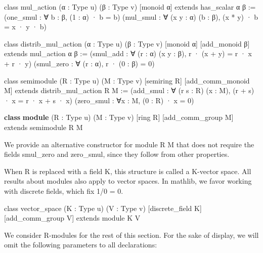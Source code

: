 \documentclass[
]{article}
\newenvironment{Shaded}{}{}
\newcommand{\DataTypeTok}[1]{\textcolor[rgb]{0.56,0.13,0.00}{#1}}
\newcommand{\KeywordTok}[1]{\textcolor[rgb]{0.00,0.44,0.13}{\textbf{#1}}}
\newcommand{\NormalTok}[1]{#1}
\begin{document}
\begin{Shaded}
\begin{Highlighting}[]
\NormalTok{class mul\_action (α : Type u) (β : Type v)}
\NormalTok{    [monoid α] extends has\_scalar α β :=}
\NormalTok{(one\_smul : ∀ b : β, (1 : α) · b = b)}
\NormalTok{(mul\_smul : ∀ (x y : α) (b : β),}
\NormalTok{    (x * y) · b = x · y · b)}

\NormalTok{class distrib\_mul\_action (α : Type u)}
\NormalTok{    (β : Type v) [monoid α] [add\_monoid β]}
\NormalTok{    extends mul\_action α β :=}
\NormalTok{(smul\_add : ∀ (r : α) (x y : β),}
\NormalTok{    r · (x + y) = r · x + r · y)}
\NormalTok{(smul\_zero : ∀ (r : α), r · (0 : β) = 0)}

\NormalTok{class semimodule (R : Type u) (M : Type v)}
\NormalTok{    [semiring R] [add\_comm\_monoid M]}
\NormalTok{    extends distrib\_mul\_action R M :=}
\NormalTok{(add\_smul : ∀ (r s : R) (x : M),}
\NormalTok{    (r + s) · x = r · x + s · x)}
\NormalTok{(zero\_smul : ∀x : M, (0 : R) · x = 0) }
\end{Highlighting}
\end{Shaded}

\begin{Shaded}
\begin{Highlighting}[]
\KeywordTok{class} \KeywordTok{module}\NormalTok{ (R : }\DataTypeTok{Type}\NormalTok{ u) (M : }\DataTypeTok{Type}\NormalTok{ v)}
\NormalTok{    [ring R] [add\_comm\_group M]}
\NormalTok{    extends semimodule R M }
\end{Highlighting}
\end{Shaded}

We provide an alternative constructor for module R M that does not
require the fields smul\_zero and zero\_smul, since they follow from
other properties.

When R is replaced with a field K, this structure is called a K-vector
space. All results about modules also apply to vector spaces. In
mathlib, we favor working with discrete fields, which fix 1/0 = 0.

\begin{Shaded}
\begin{Highlighting}[]
\NormalTok{class vector\_space (K : Type u) (V : Type v)}
\NormalTok{[discrete\_field K] [add\_comm\_group V]}
\NormalTok{extends module K V }
\end{Highlighting}
\end{Shaded}

We consider R-modules for the rest of this section. For the sake of
display, we will omit the following parameters to all declarations:
\end{document}
